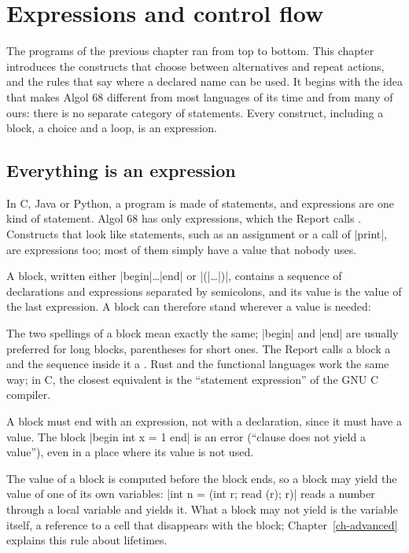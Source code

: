 \chapter{Expressions and control flow}\label{ch-control}

The programs of the previous chapter ran from top to bottom. This chapter
introduces the constructs that choose between alternatives and repeat
actions, and the rules that say where a declared name can be used. It
begins with the idea that makes Algol 68 different from most languages of
its time and from many of ours: there is no separate category of
statements. Every construct, including a block, a choice and a loop, is an
expression.

\section{Everything is an expression}\label{sec-everything}

In C, Java or Python, a program is made of statements, and expressions
are one kind of statement. Algol 68 has only expressions, which the Report
calls . Constructs that look like statements, such as an
assignment or a call of \code|print|, are expressions too; most of them
simply have a value that nobody uses.

A block, written either \code|begin|\ldots\code|end| or
\code|(|\ldots\code|)|, contains a sequence of declarations and expressions
separated by semicolons, and its value is the value of the last
expression. A block can therefore stand wherever a value is needed:


The two spellings of a block mean exactly the same; \code|begin| and
\code|end| are usually preferred for long blocks, parentheses for short
ones. The Report calls a block a  and the sequence inside
it a . Rust and the functional languages work the same
way; in C, the closest equivalent is the ``statement expression'' of the
GNU C compiler.

A block must end with an expression, not with a declaration, since it
must have a value. The block \code|begin int x = 1 end| is an error
(``clause does not yield a value''), even in a place where its value is
not used.

The value of a block is computed before the block ends, so a block may
yield the value of one of its own variables: \code|int n = (int r; read (r); r)|
reads a number through a local variable and yields it. What a block may
not yield is the variable itself, a reference to a cell that disappears
with the block; Chapter~\ref{ch-advanced} explains this rule about
lifetimes.

